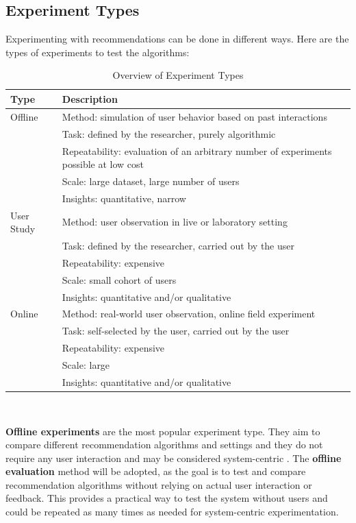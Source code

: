 \documentclass[\myFontSize,a4paper,oneside,hidelinks]{article}
\begin{document}
\subsection{Experiment Types}
%
Experimenting with recommendations can be done in different ways. Here are the types of experiments to test the algorithms:
{
\renewcommand{\arraystretch}{1.5}
\begin{table}[h!]
\centering
\begin{tabular}{p{3cm}|p{10cm}}
\hline
\textbf{Type} & \textbf{Description} \\
\hline
Offline & Method: simulation of user behavior based on past interactions \\
        & Task: defined by the researcher, purely algorithmic \\
        & Repeatability: evaluation of an arbitrary number of experiments possible at low cost \\
        & Scale: large dataset, large number of users \\
        & Insights: quantitative, narrow \\
\hline
User Study & Method: user observation in live or laboratory setting \\
           & Task: defined by the researcher, carried out by the user \\
           & Repeatability: expensive \\
           & Scale: small cohort of users \\
           & Insights: quantitative and/or qualitative \\
\hline
Online & Method: real-world user observation, online field experiment \\
       & Task: self-selected by the user, carried out by the user \\
       & Repeatability: expensive \\
       & Scale: large \\
       & Insights: quantitative and/or qualitative \\
\hline
\end{tabular}

\caption{Overview of Experiment Types \cite{Zangerle2023}}
\end{table}\\
}
%
%
\textbf{Offline experiments} are the most popular experiment type. They aim to compare different recommendation algorithms and settings and they do not require any user interaction and may be considered system-centric \cite{Zangerle2023}. 
The \textbf{offline evaluation} method will be adopted, as the goal is to test and compare recommendation algorithms without relying on actual user interaction or feedback. This provides a practical way to test the system without users and could be repeated as many times as needed for system-centric experimentation.
\end{document}

